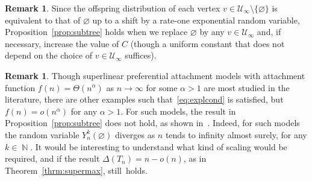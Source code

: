 \documentclass[11pt]{article}
\numberwithin{equation}{section}
\DeclareMathOperator{\N}{\mathbb{N}} %
\def\cU{{\mathcal U}}
\theoremstyle{definition}
\newtheorem{remark}[theorem]{Remark}
\begin{document}
\begin{remark}\label{rem:offspring}
    Since the offspring distribution of each vertex $v\in \cU_\infty\setminus\{\varnothing\}$   is equivalent to that of $\varnothing$ up to a shift by a rate-one exponential random variable,  Proposition~\ref{prop:subtree} holds when we replace $\varnothing$ by any $v\in\cU_\infty$ and, if necessary, increase the value of $C$ (though a uniform constant that does not depend on the choice of $v\in \cU_\infty$ suffices).
\end{remark}



\begin{remark}
    Though superlinear preferential attachment models with attachment function $f(n)=\Theta(n^\alpha)$ as $n\to \infty$  for some $\alpha>1$ are most studied in the literature, there are other examples  such that~\eqref{eq:explcond} is satisfied, but $f(n)=o(n^\alpha)$ for any $\alpha>1$. For such models, the result in Proposition~\ref{prop:subtree} does not hold, as shown in~\cite[Theorem $3.21$]{LodIyer23}. Indeed, for such models the random variable $Y^k_n(\varnothing)$ diverges as $n$ tends to infinity almost surely, for any $k\in\N$. It would be interesting to understand what kind of scaling would be required, and if the result $\Delta(T_n)=n-o(n)$, as in Theorem~\ref{thrm:supermax}, still~holds.
\end{remark}
\end{document}
